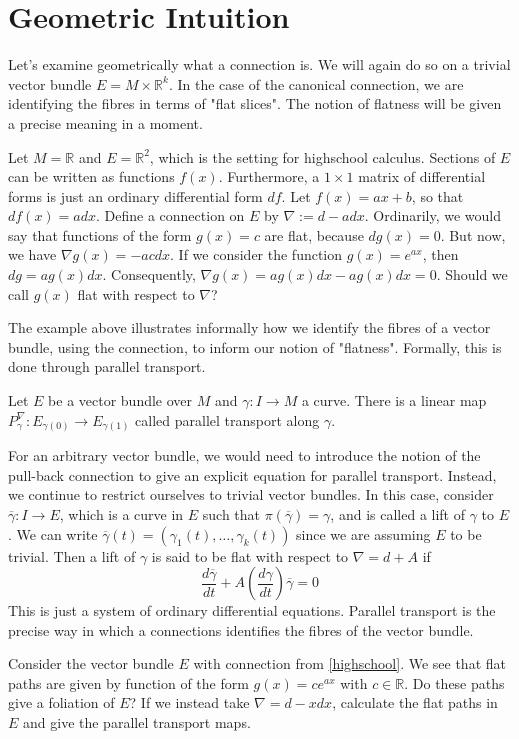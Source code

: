 \section{Geometric Intuition}

Let's examine geometrically what a connection is. We will again do so on a trivial vector bundle $E=M\times\mathbb{R}^k$. In the case of the canonical connection, we are identifying the fibres in terms of "flat slices". The notion of flatness will be given a precise meaning in a moment.
\begin{example}\label{highschool}
  Let $M=\mathbb{R}$ and $E=\mathbb{R}^2$, which is the setting for highschool calculus. Sections of $E$ can be written as functions $f(x)$. Furthermore, a $1\times 1$ matrix of differential forms is just an ordinary differential form $df$. Let $f(x)=ax+b$, so that $df(x)=adx$. Define a connection on $E$ by $\nabla:=d-adx$. Ordinarily, we would say that functions of the form $g(x)=c$ are flat, because $dg(x)=0$. But now, we have $\nabla g(x)=-acdx$. If we consider the function $g(x)=e^{ax}$, then $dg=ag(x)dx$. Consequently, $\nabla g(x)=ag(x)dx-ag(x)dx=0$. Should we call $g(x)$ flat with respect to $\nabla$?
\end{example}
The example above illustrates informally how we identify the fibres of a vector bundle, using the connection, to inform our notion of "flatness". Formally, this is done through parallel transport.
\begin{definition}
  Let $E$ be a vector bundle over $M$ and $\gamma:I\to M$ a curve. There is a linear map $P^\nabla_\gamma:E_{\gamma(0)}\to E_{\gamma(1)}$ called parallel transport along $\gamma$.
\end{definition}
For an arbitrary vector bundle, we would need to introduce the notion of the pull-back connection to give an explicit equation for parallel transport. Instead, we continue to restrict ourselves to trivial vector bundles. In this case, consider $\overline{\gamma}:I\to E$, which is a curve in $E$ such that $\pi(\overline{\gamma})=\gamma$, and is called a lift of $\gamma$ to $E$. We can write $\overline{\gamma}(t)=(\gamma_1(t),\dots,\gamma_k(t))$ since we are assuming $E$ to be trivial. Then a lift of $\gamma$ is said to be flat with respect to $\nabla=d+A$ if
$$\frac{d\overline{\gamma}}{dt}+A(\frac{d\gamma}{dt})\overline{\gamma}=0$$
This is just a system of ordinary differential equations. Parallel transport is the precise way in which a connections identifies the fibres of the vector bundle.
\begin{exercise}
  Consider the vector bundle $E$ with connection from \ref{highschool}. We see that flat paths are given by function of the form $g(x)=ce^{ax}$ with $c\in\mathbb{R}$. Do these paths give a foliation of $E$? If we instead take $\nabla=d-xdx$, calculate the flat paths in $E$ and give the parallel transport maps.
\end{exercise}


